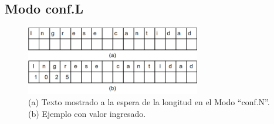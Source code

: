 \documentclass[main_conf.tex]{subfiles}
\begin{document}
\subsection{Modo conf.L}

\begin{figure}[!t]
  \centering
  \includegraphics[width=3.0in]{../img/modo/Conf_N.png}
  \caption{(a) Texto mostrado a la espera de la longitud en el Modo “conf.N”.
           (b) Ejemplo con valor ingresado.
  }
  \label{Modo_Conf_N}
\end{figure}
\end{document}
